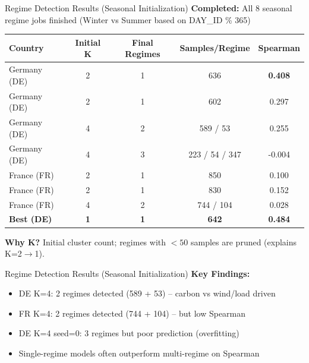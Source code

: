 \documentclass[aspectratio=169]{beamer}
\begin{document}
\begin{frame}{Regime Detection Results (Seasonal Initialization)}
\textbf{Completed:} All 8 seasonal regime jobs finished (Winter vs Summer based on DAY\_ID \% 365)

\vspace{0.2cm}
\begin{table}
\centering
\small
\begin{tabular}{l|c|c|c|c}
\toprule
\textbf{Country} & \textbf{Initial K} & \textbf{Final Regimes} & \textbf{Samples/Regime} & \textbf{Spearman} \\
\midrule
Germany (DE) & 2 & 1 & 636 & \textbf{0.408} \\
Germany (DE) & 2 & 1 & 602 & 0.297 \\
\textcolor{reprogreen}{Germany (DE)} & \textcolor{reprogreen}{4} & \textcolor{reprogreen}{2} & \textcolor{reprogreen}{589 / 53} & \textcolor{reprogreen}{0.255} \\
Germany (DE) & 4 & 3 & 223 / 54 / 347 & -0.004 \\
France (FR) & 2 & 1 & 850 & 0.100 \\
France (FR) & 2 & 1 & 830 & 0.152 \\
\textcolor{reprogreen}{France (FR)} & \textcolor{reprogreen}{4} & \textcolor{reprogreen}{2} & \textcolor{reprogreen}{744 / 104} & 0.028 \\
\midrule
\rowcolor{lightgray} \textbf{Best (DE)} & \textbf{1} & \textbf{1} & \textbf{642} & \textbf{0.484} \\
\bottomrule
\end{tabular}
\end{table}

\vspace{0.1cm}
\textbf{Why K?} Initial cluster count; regimes with $<50$ samples are pruned (explains K=2$\rightarrow$1).
\end{frame}

\begin{frame}{Regime Detection Results (Seasonal Initialization)}
\textbf{Key Findings:}
\begin{itemize}
    \item \textcolor{reprogreen}{DE K=4: 2 regimes detected} (589 + 53) -- carbon vs wind/load driven
    \item \textcolor{reprogreen}{FR K=4: 2 regimes detected} (744 + 104) -- but low Spearman
    \item DE K=4 seed=0: 3 regimes but poor prediction (overfitting)
    \item Single-regime models often outperform multi-regime on Spearman
\end{itemize}
\end{frame}
\end{document}
